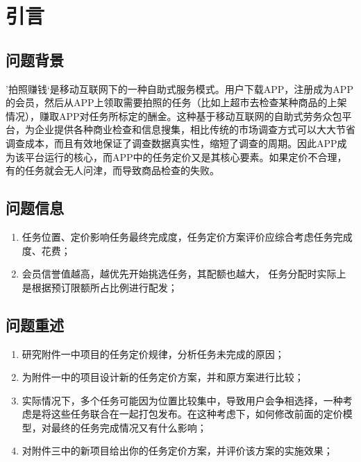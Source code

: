 \documentclass{article}
\begin{document}
\fi
\clearpage
\setcounter{section}{-1}
\section{引言}
\subsection{问题背景}
’拍照赚钱‘是移动互联网下的一种自助式服务模式。用户下载APP，注册成为APP的会员，然后从APP上领取需要拍照的任务（比如上超市去检查某种商品的上架情况），赚取APP对任务所标定的酬金。这种基于移动互联网的自助式劳务众包平台，为企业提供各种商业检查和信息搜集，相比传统的市场调查方式可以大大节省调查成本，而且有效地保证了调查数据真实性，缩短了调查的周期。因此APP成为该平台运行的核心，而APP中的任务定价又是其核心要素。如果定价不合理，有的任务就会无人问津，而导致商品检查的失败。
\subsection{问题信息}
\begin{enumerate}
	\item 任务位置、定价影响任务最终完成度，任务定价方案评价应综合考虑任务完成度、花费；
	\item 会员信誉值越高，越优先开始挑选任务，其配额也越大， 任务分配时实际上是根据预订限额所占比例进行配发；
\end{enumerate}
\subsection{问题重述}
\begin{enumerate}
	\item 研究附件一中项目的任务定价规律，分析任务未完成的原因；
	\item 为附件一中的项目设计新的任务定价方案，并和原方案进行比较；
	\item 实际情况下，多个任务可能因为位置比较集中，导致用户会争相选择，一种考虑是将这些任务联合在一起打包发布。在这种考虑下，如何修改前面的定价模型，对最终的任务完成情况又有什么影响；
	\item 对附件三中的新项目给出你的任务定价方案，并评价该方案的实施效果；
\end{enumerate}
\end{document}
